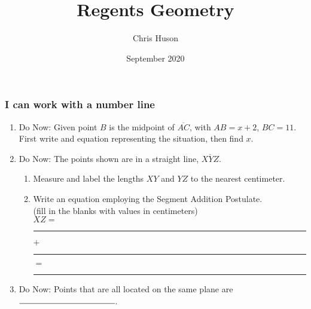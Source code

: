 \documentclass[12pt, twoside]{article}
\title{Regents Geometry}
\author{Chris Huson}
\date{September 2020}
\begin{document}
\subsubsection*{I can work with a number line}
\begin{enumerate}
\item Do Now: Given point $B$ is the midpoint of $\overline{AC}$, with $AB=x+2$, $BC=11$. \\[0.3cm]
    First write and equation representing the situation, then find $x$.\\[0.3cm]
      \vspace{1cm}

\item Do Now: The points shown are in a straight line, $\overline{XYZ}$. 
\begin{enumerate}
  \item Measure and label the lengths $XY$ and $YZ$ to the nearest centimeter.\\[1.5cm]
     \vspace{0.5cm}
  \item Write an equation employing the Segment Addition Postulate.\\ (fill in the blanks with values in centimeters)\\[1cm]
  $XZ=$ \rule{2cm}{0.15mm} $+$ \rule{2cm}{0.15mm} $=$ \rule{2cm}{0.15mm}
\end{enumerate} \vspace{0.5cm}

\item Do Now: Points that are all located on the same plane are $\rule{4cm}{0.15mm}$.


\end{enumerate}
\end{document}
